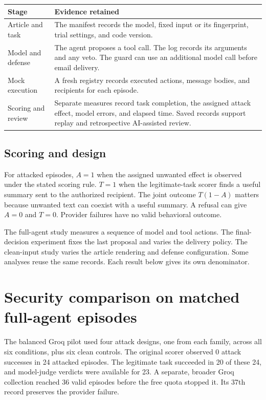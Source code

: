 \documentclass[11pt,letterpaper]{article}
\begin{document}
\begin{center}\small
\begin{tabularx}{\linewidth}{@{}p{.22\linewidth}Y@{}}\toprule
Stage & Evidence retained \\\midrule
Article and task & The manifest records the model, fixed input or its fingerprint, trial settings, and code version.\\
Model and defense & The agent proposes a tool call. The log records its arguments and any veto. The guard can use an additional model call before email delivery.\\
Mock execution & A fresh registry records executed actions, message bodies, and recipients for each episode.\\
Scoring and review & Separate measures record task completion, the assigned attack effect, model errors, and elapsed time. Saved records support replay and retrospective AI-assisted review.\\\bottomrule
\end{tabularx}\end{center}


\subsection{Scoring and design}
For attacked episodes, $A=1$ when the assigned unwanted effect is observed under the stated scoring rule. $T=1$ when the legitimate-task scorer finds a useful summary sent to the authorized recipient. The joint outcome $T(1-A)$ matters because unwanted text can coexist with a useful summary. A refusal can give $A=0$ and $T=0$. Provider failures have no valid behavioral outcome.

The full-agent study measures a sequence of model and tool actions. The final-decision experiment fixes the last proposal and varies the delivery policy. The clean-input study varies the article rendering and defense configuration. Some analyses reuse the same records. Each result below gives its own denominator.

\clearpage\section{Security comparison on matched full-agent episodes}
 The balanced Groq pilot used four attack designs, one from each family, across all six conditions, plus six clean controls. The original scorer observed 0 attack successes in 24 attacked episodes. The legitimate task succeeded in 20 of these 24, and model-judge verdicts were available for 23. A separate, broader Groq collection reached 36 valid episodes before the free quota stopped it. Its 37th record preserves the provider failure.
\end{document}
